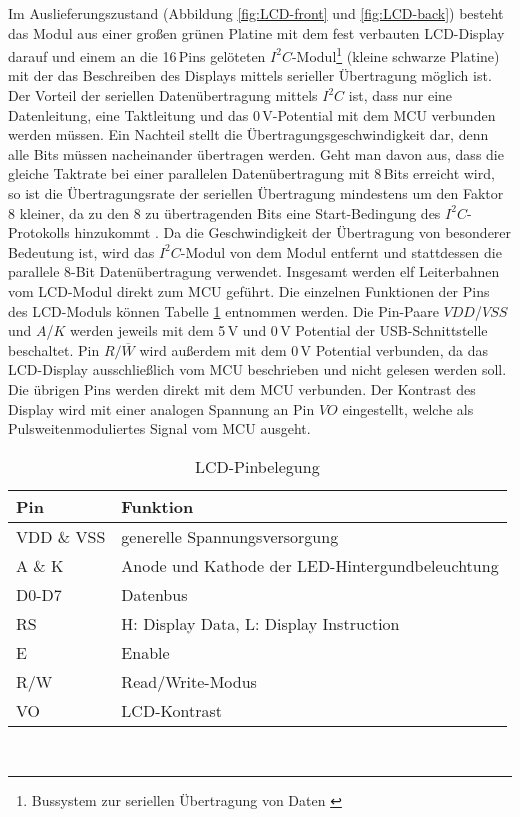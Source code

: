 Im Auslieferungszustand (Abbildung \ref{fig:LCD-front} und \ref{fig:LCD-back}) besteht das Modul aus einer großen grünen Platine mit dem fest verbauten LCD-Display darauf und einem an die 16\,Pins gelöteten $I^2C$-Modul\footnote{Bussystem zur seriellen Übertragung von Daten \cite[S. 61]{MCU_in_Practice}} (kleine schwarze Platine) mit der das Beschreiben des Displays mittels serieller Übertragung möglich ist. Der Vorteil der seriellen Datenübertragung mittels $I^2C$ ist, dass nur eine Datenleitung, eine Taktleitung und das 0\,V-Potential mit dem MCU verbunden werden müssen. Ein Nachteil stellt die Übertragungsgeschwindigkeit dar, denn alle Bits müssen nacheinander übertragen werden. Geht man davon aus, dass die gleiche Taktrate bei einer parallelen Datenübertragung mit 8\,Bits erreicht wird, so ist die Übertragungsrate der seriellen Übertragung mindestens um den Faktor 8 kleiner, da zu den 8 zu übertragenden Bits eine Start-Bedingung des $I^2C$-Protokolls hinzukommt \cite[S. 62]{MCU_in_Practice}. Da die Geschwindigkeit der Übertragung von besonderer Bedeutung ist, wird das $I^2C$-Modul von dem Modul entfernt und stattdessen die parallele 8-Bit Datenübertragung verwendet. Insgesamt werden elf Leiterbahnen vom LCD-Modul direkt zum MCU geführt. Die einzelnen Funktionen der Pins des LCD-Moduls können Tabelle \ref{tab:LCD_Pins} entnommen werden. Die Pin-Paare $VDD$/$VSS$ und $A$/$K$ werden jeweils mit dem 5\,V und 0\,V Potential der USB-Schnittstelle beschaltet. Pin $R/\overline{W}$ wird außerdem mit dem 0\,V Potential verbunden, da das LCD-Display ausschließlich vom MCU beschrieben und nicht gelesen werden soll. Die übrigen Pins werden direkt mit dem MCU verbunden. Der Kontrast des Display wird mit einer analogen Spannung an Pin $VO$ eingestellt, welche als Pulsweitenmoduliertes Signal vom MCU ausgeht.
\begin{table}[h]
	\begin{center}
		\begin{tabular}{l | l}
			\textbf{Pin} & \textbf{Funktion}\\
			\hline
			VDD \& VSS & generelle Spannungsversorgung\\
			A \& K & Anode und Kathode der LED-Hintergundbeleuchtung\\
			D0-D7 & Datenbus\\
			RS & H: Display Data, L: Display Instruction\\
			E & Enable\\
			R/W & Read/Write-Modus\\
			VO & LCD-Kontrast\\
		\end{tabular}
	\caption{LCD-Pinbelegung \cite[s. 7]{LCD_MN}}
	\label{tab:LCD_Pins}
	\end{center}
\end{table}\\
